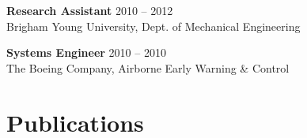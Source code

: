 \documentclass[letterpaper, 10pt]{article}
\begin{document}
\textbf{Research Assistant}
\hfill 2010 -- 2012\\ %
Brigham Young University, Dept. of Mechanical Engineering %
\medskip

\textbf{Systems Engineer}
\hfill 2010 -- 2010\\ %
The Boeing Company, Airborne Early Warning \& Control %

\section{Publications}

\end{document}
